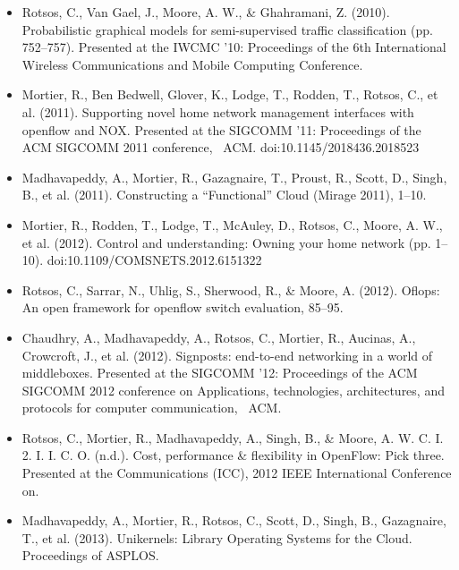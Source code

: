 \begin{itemize}
  \item Rotsos, C., Van Gael, J., Moore, A. W., \& Ghahramani, Z. (2010).
        Probabilistic graphical models for semi-supervised traffic
        classification (pp. 752–757). Presented at the IWCMC '10: Proceedings of
        the 6th International Wireless Communications and Mobile Computing
        Conference.
  \item Mortier, R., Ben Bedwell, Glover, K., Lodge, T., Rodden, T., Rotsos, C.,
        et al. (2011). Supporting novel home network management interfaces with
        openflow and NOX. Presented at the SIGCOMM '11: Proceedings of the ACM
        SIGCOMM 2011 conference,  ACM. doi:10.1145/2018436.2018523
  \item Madhavapeddy, A., Mortier, R., Gazagnaire, T., Proust, R., Scott, D.,
        Singh, B., et al. (2011). Constructing a “Functional” Cloud (Mirage
        2011), 1–10.
  \item Mortier, R., Rodden, T., Lodge, T., McAuley, D., Rotsos, C., Moore, A.
        W., et al. (2012). Control and understanding: Owning your home network
        (pp. 1–10). doi:10.1109/COMSNETS.2012.6151322
  \item Rotsos, C., Sarrar, N., Uhlig, S., Sherwood, R., \& Moore, A. (2012).
        Oflops: An open framework for openflow switch evaluation, 85–95.
  \item Chaudhry, A., Madhavapeddy, A., Rotsos, C., Mortier, R., Aucinas, A.,
        Crowcroft, J., et al. (2012). Signposts: end-to-end networking in a
        world of middleboxes. Presented at the SIGCOMM '12: Proceedings of the
        ACM SIGCOMM 2012 conference on Applications, technologies,
        architectures, and protocols for computer communication,  ACM.
  \item Rotsos, C., Mortier, R., Madhavapeddy, A., Singh, B., \& Moore, A. W. C.
        I. 2. I. I. C. O. (n.d.). Cost, performance \& flexibility in OpenFlow:
        Pick three. Presented at the Communications (ICC), 2012 IEEE
        International Conference on.
  \item Madhavapeddy, A., Mortier, R., Rotsos, C., Scott, D., Singh, B.,
        Gazagnaire, T., et al. (2013). Unikernels: Library Operating Systems for
        the Cloud. Proceedings of ASPLOS.  
\end{itemize}



